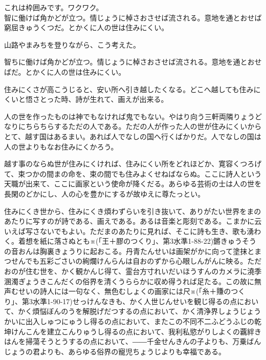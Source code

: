 \documentclass[book, twoside, paper=b5j, fleqn, jafontsize=9pt, jafontscale=0.91, head_space=22mm, foot_space=9mm, fore-edge=16mm, gutter=25mm, hanging_punctuation]{jlreq}
\begin{document}
\begin{framebox-guideline}
これは枠囲みです。ワクワク\footnotemark[6]。\\
智に働けば角かどが立つ。情じょうに棹さおさせば流される。意地を通とおせば窮屈きゅうくつだ。とかくに人の世は住みにくい。
\end{framebox-guideline}
山路やまみちを登りながら、こう考えた。

智ちに働けば角かどが立つ。情じょうに棹さおさせば流される。意地を通とおせばだ。とかくに人の世は住みにくい。

住みにくさが高こうじると、安い所へ引き越したくなる。どこへ越しても住みにくいと悟さとった時、詩が生れて、画えが出来る。

人の世を作ったものは神でもなければ鬼でもない。やはり向う三軒両隣りょうどなりにちらちらするただの人である。ただの人が作った人の世が住みにくいからとて、越す国はあるまい。あれば人でなしの国へ行くばかりだ。人でなしの国は人の世よりもなお住みにくかろう。

越す事のならぬ世が住みにくければ、住みにくい所をどれほどか、寛容くつろげて、束つかの間まの命を、束の間でも住みよくせねばならぬ。ここに詩人という天職が出来て、ここに画家という使命が降くだる。あらゆる芸術の士は人の世を長閑のどかにし、人の心を豊かにするが故ゆえに尊たっとい。

住みにくき世から、住みにくき煩わずらいを引き抜いて、ありがたい世界をまのあたりに写すのが詩である、画えである。あるは音楽と彫刻である。こまかに云いえば写さないでもよい。ただまのあたりに見れば、そこに詩も生き、歌も湧わく。着想を紙に落さぬとも※(「王＋膠のつくり」、第3水準1-88-22)鏘きゅうそうの音おんは胸裏きょうりに起おこる。丹青たんせいは画架がかに向って塗抹とまつせんでも五彩ごさいの絢爛けんらんは自おのずから心眼しんがんに映る。ただおのが住む世を、かく観かんじ得て、霊台方寸れいだいほうすんのカメラに澆季溷濁ぎょうきこんだくの俗界を清くうららかに収め得うれば足たる。この故に無声むせいの詩人には一句なく、無色むしょくの画家には尺※(「糸＋賺のつくり」、第3水準1-90-17)せっけんなきも、かく人世じんせいを観じ得るの点において、かく煩悩ぼんのうを解脱げだつするの点において、かく清浄界しょうじょうかいに出入しゅつにゅうし得るの点において、またこの不同不二ふどうふじの乾坤けんこんを建立こんりゅうし得るの点において、我利私慾がりしよくの覊絆きはんを掃蕩そうとうするの点において、――千金せんきんの子よりも、万乗ばんじょうの君よりも、あらゆる俗界の寵児ちょうじよりも幸福である。
\end{document}
